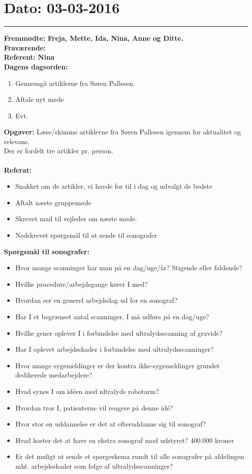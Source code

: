 \section{Dato: 03-03-2016}
\hrule
\textbf{Fremmødte: Freja, Mette, Ida, Nina, Anne og Ditte.} \\
\textbf{Fraværende:} \\
\textbf{Referent: Nina } \\
\textbf{Dagens dagsorden: }
\begin{enumerate}
	\item Gennemgå artiklerne fra Søren Pallesen.
	\item Aftale nyt møde
	\item Evt. 
\end{enumerate}

\textbf{Opgaver:} \newline
Læse/skimme artiklerne fra Søren Pallesen igennem for aktualitet og relevans. \\
Der er fordelt tre artikler pr. person.\\\\
\textbf{Referat:}
\begin{itemize}
\item Snakket om de artikler, vi havde for til i dag og udvalgt de bedste
\item Aftalt næste gruppemøde
\item Skrevet mail til vejleder om næste møde.
\item Nedskrevet spørgsmål til at sende til sonografer
\end{itemize}
\textbf{Spørgsmål til sonografer:}
\begin{itemize}
\item Hvor mange scanninger har man på en dag/uge/år? Stigende eller faldende?
\item Hvilke procedure/arbejdsgange kører I med?
\item Hvordan ser en generel arbejdsdag ud for en sonograf?
\item Har I et begrænset antal scanninger, I må udføre på en dag/uge?
\item Hvilke gener oplever I i forbindelse med ultralydsscanning af gravide?
\item Har I oplevet arbejdsskader i forbindelse med ultralydsscanninger?
\item Hvor mange sygemeldinger er der kontra ikke-sygemeldinger grundet dedikerede medarbejdere?
\item Hvad synes I om idéen med ultralyds robotarm?
\item Hvordan tror I, patienterne vil reagere på denne idé?
\item Hvor stor en uddannelse er det at efteruddanne sig til sonograf?
\item Hvad koster det at have en ekstra sonograf mod udstyret?
400.000 kroner
\item Er det muligt at sende et spørgeskema rundt til alle sonografer på afdelingen mht. arbejdsskader som følge af ultralydsscanninger?
\end{itemize}
